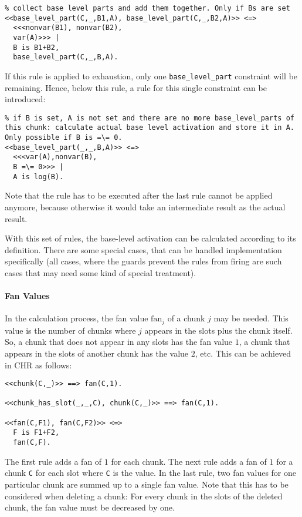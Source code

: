 \begin{lstlisting}
% collect base level parts and add them together. Only if Bs are set
<<base_level_part(C,_,B1,A), base_level_part(C,_,B2,A)>> <=>
  <<<nonvar(B1), nonvar(B2), 
  var(A)>>> |
  B is B1+B2,
  base_level_part(C,_,B,A).
\end{lstlisting}

If this rule is applied to exhaustion, only one \lstinline|base_level_part| constraint will be remaining. Hence, below this rule, a rule for this single constraint can be introduced:

\begin{lstlisting}
% if B is set, A is not set and there are no more base_level_parts of this chunk: calculate actual base level activation and store it in A. Only possible if B is =\= 0.
<<base_level_part(_,_,B,A)>> <=>
  <<<var(A),nonvar(B), 
  B =\= 0>>> |
  A is log(B).
\end{lstlisting}

Note that the rule has to be executed after the last rule cannot be applied anymore, because otherwise it would take an intermediate result as the actual result.

With this set of rules, the base-level activation can be calculated according to its definition. There are some special cases, that can be handled implementation specifically (all cases, where the guards prevent the rules from firing are such cases that may need some kind of special treatment).

\paragraph{Fan Values}

In the calculation process, the fan value $\mathrm{fan}_j$ of a chunk $j$ may be needed. This value is the number of chunks where $j$ appears in the slots plus the chunk itself. So, a chunk that does not appear in any slots has the fan value $1$, a chunk that appears in the slots of another chunk has the value $2$, etc. This can be achieved in CHR as follows:

\begin{lstlisting}
<<chunk(C,_)>> ==> fan(C,1).

<<chunk_has_slot(_,_,C), chunk(C,_)>> ==> fan(C,1).

<<fan(C,F1), fan(C,F2)>> <=> 
  F is F1+F2, 
  fan(C,F).
\end{lstlisting}

The first rule adds a fan of $1$ for each chunk. The next rule adds a fan of $1$ for a chunk \lstinline|C| for each slot where \lstinline|C| is the value. In the last rule, two fan values for one particular chunk are summed up to a single fan value. Note that this has to be considered when deleting a chunk: For every chunk in the slots of the deleted chunk, the fan value must be decreased by one.

